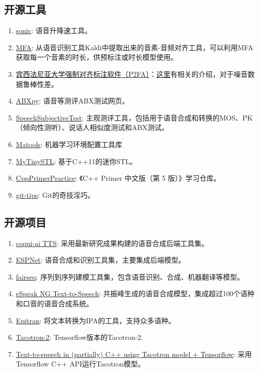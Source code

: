 \documentclass[cn,10pt,math=newtx,citestyle=gb7714-2015,bibstyle=gb7714-2015]{elegantbook}
\begin{document}
\subsection{开源工具}
\begin{enumerate}
  \item \href{https://github.com/waywardgeek/sonic}{sonic}: 语音升降速工具。
  \item \href{https://github.com/MontrealCorpusTools/Montreal-Forced-Aligner/releases/download/v1.0.1/montreal-forced-aligner_linux.tar.gz}{MFA}: 从语音识别工具Kaldi中提取出来的音素-音频对齐工具，可以利用MFA获取每一个音素的时长，供预标注或时长模型使用。
  \item \href{https://github.com/jaekookang/p2fa_py3}{宾西法尼亚大学强制对齐标注软件（P2FA）}：\href{https://blog.csdn.net/jojozhangju/article/details/51951622}{这里}有相关的介绍，对于噪音数据鲁棒性差。
  \item \href{https://github.com/bootphon/ABXpy}{ABXpy}: 语音等测评ABX测试网页。
  \item \href{https://github.com/bigpon/SpeechSubjectiveTest}{SpeechSubjectiveTest}: 主观测评工具，包括用于语音合成和转换的MOS、PK（倾向性测听）、说话人相似度测试和ABX测试。
  \item \href{https://github.com/matpool/matools}{Matools}: 机器学习环境配置工具库
  \item \href{https://github.com/Alinshans/MyTinySTL}{MyTinySTL}: 基于C++11的迷你STL。
  \item \href{https://github.com/applenob/Cpp_Primer_Practice}{CppPrimerPractice}: 《C++ Primer 中文版（第 5 版）》学习仓库。
  \item \href{https://github.com/521xueweihan/git-tips}{git-tips}: Git的奇技淫巧。
\end{enumerate}

\subsection{开源项目}
\begin{enumerate}
  \item \href{https://github.com/coqui-ai/TTS}{coqui-ai TTS}: 采用最新研究成果构建的语音合成后端工具集。
  \item \href{https://github.com/espnet/espnet}{ESPNet}: 语音合成和识别工具集，主要集成后端模型。
  \item \href{https://github.com/pytorch/fairseq}{fairseq}: 序列到序列建模工具集，包含语音识别、合成、机器翻译等模型。
  \item \href{https://github.com/espeak-ng/espeak-ng}{eSpeak NG Text-to-Speech}: 共振峰生成的语音合成模型，集成超过100个语种和口音的语音合成系统。
  \item \href{https://github.com/dmort27/epitran}{Epitran}: 将文本转换为IPA的工具，支持众多语种。
  \item \href{https://github.com/Rayhane-mamah/Tacotron-2}{Tacotron-2}: Tensorflow版本的Tacotron-2.
  \item \href{https://github.com/syoyo/tacotron-tts-cpp}{Text-to-speech in (partially) C++ using Tacotron model + Tensorflow}: 采用Tensorflow C++ API运行Tacotron模型。
\end{enumerate}
\end{document}
